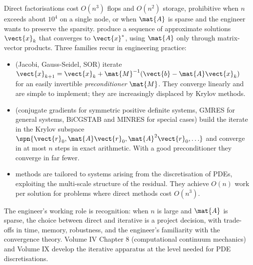 Direct factorisations cost $O(n^{3})$ flops and $O(n^{2})$
storage, prohibitive when $n$ exceeds about $10^{4}$ on a single
node, or when $\mat{A}$ is sparse and the engineer wants to
preserve the sparsity.  produce a
sequence of approximate solutions $\vect{x}_{k}$ that converges to
$\vect{x}^{*}$, using $\mat{A}$ only through matrix-vector
products. Three families recur in engineering practice:

\begin{itemize}[leftmargin=*]
  \item {} (Jacobi, Gauss-Seidel, SOR)
    iterate $\vect{x}_{k+1} = \vect{x}_{k} + \mat{M}^{-1}(\vect{b}
    - \mat{A}\vect{x}_{k})$ for an easily invertible
    \emph{preconditioner} $\mat{M}$. They converge linearly and
    are simple to implement; they are increasingly displaced by
    Krylov methods.
  \item {} (conjugate gradients for
    symmetric positive definite systems, GMRES for general
    systems, BiCGSTAB and MINRES for special cases) build the
    iterate in the Krylov subspace $\spn\{\vect{r}_{0},
    \mat{A}\vect{r}_{0}, \mat{A}^{2}\vect{r}_{0}, \ldots\}$ and
    converge in at most $n$ steps in exact arithmetic. With a
    good preconditioner they converge in far fewer.
  \item {} methods are tailored to systems
    arising from the discretisation of PDEs, exploiting the
    multi-scale structure of the residual. They achieve $O(n)$
    work per solution for problems where direct methods cost
    $O(n^{3})$.
\end{itemize}

The engineer's working role is recognition: when $n$ is large and
$\mat{A}$ is sparse, the choice between direct and iterative is a
project decision, with trade-offs in time, memory, robustness,
and the engineer's familiarity with the convergence theory.
Volume IV Chapter 8 (computational continuum mechanics) and
Volume IX develop the iterative apparatus at the level needed for
PDE discretisations.

